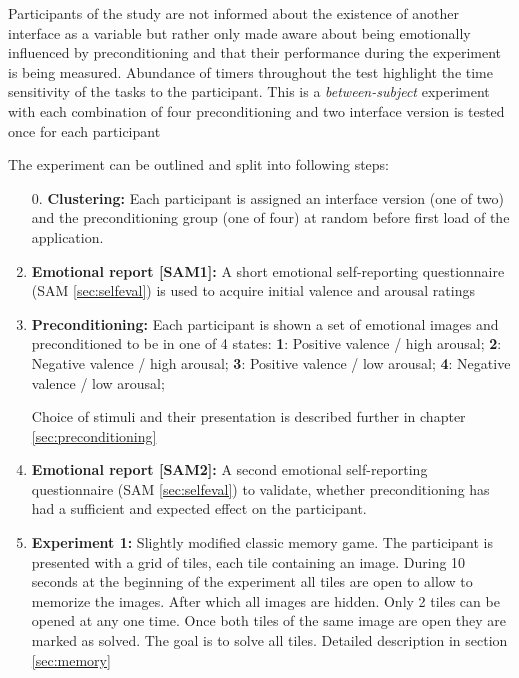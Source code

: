 	Participants of the study are not informed about the existence of another interface as a variable but rather only made aware about being emotionally influenced by preconditioning and that their performance during the experiment is being measured. Abundance of timers throughout the test highlight the time sensitivity of the tasks to the participant. This is a \textit{between-subject} experiment with each combination of four preconditioning and two interface version is tested once for each participant
	
	The experiment can be outlined and split into following steps:
	
	\begin{enumerate}
		
		\item[0.] \textbf{Clustering:} Each participant is assigned an interface version (one of two) and the preconditioning group (one of four) at random before first load of the application.
		
		\item \textbf{Emotional report [SAM1]:} A short emotional self-reporting questionnaire (SAM \ref{sec:selfeval}) is used to acquire initial valence and arousal ratings
		
		\item \textbf{Preconditioning:} Each participant is shown a set of emotional images and preconditioned to be in one of 4 states:
			\textbf{1}: Positive valence / high arousal;
			\textbf{2}: Negative valence / high arousal;
			\textbf{3}: Positive valence / low arousal;
			\textbf{4}: Negative valence / low arousal;
			
		Choice of stimuli and their presentation is described further in chapter \ref{sec:preconditioning}
			
		\item \textbf{Emotional report [SAM2]:} A second emotional self-reporting questionnaire (SAM \ref{sec:selfeval}) to validate, whether preconditioning has had a sufficient and expected effect on the participant.
		
		\item \textbf{Experiment 1:} Slightly modified classic memory game. The participant is presented with a grid of tiles, each tile containing an image. During 10 seconds at the beginning of the experiment all tiles are open to allow to memorize the images. After which all images are hidden. Only 2 tiles can be opened at any one time. Once both tiles of the same image are open they are marked as solved. The goal is to solve all tiles. Detailed description in section \ref{sec:memory}
		

\end{enumerate}

